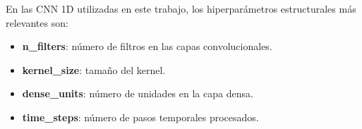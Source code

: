 En las CNN 1D utilizadas en este trabajo, los hiperparámetros estructurales más relevantes son:

\begin{itemize}
    \item \textbf{n\_filters}: número de filtros en las capas convolucionales.
    \item \textbf{kernel\_size}: tamaño del kernel.
    \item \textbf{dense\_units}: número de unidades en la capa densa.
    \item \textbf{time\_steps}: número de pasos temporales procesados.
\end{itemize}

